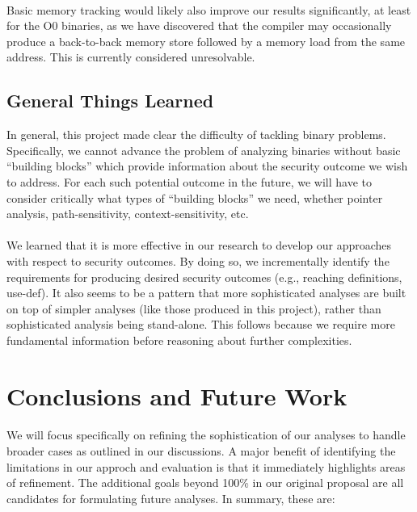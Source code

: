 \documentclass[letterpaper,11pt]{article}
\begin{document}
\paragraph{}
Basic memory tracking would likely also improve our results significantly, at
least for the O0 binaries, as we have discovered that the compiler may
occasionally produce a back-to-back memory store followed by a memory load from
the same address. This is currently considered unresolvable.

\subsection{General Things Learned}

In general, this project made clear the difficulty of tackling binary
problems. Specifically, we cannot advance the problem of analyzing binaries
without basic ``building blocks'' which provide information about the security
outcome we wish to address. For each such potential outcome in the future,
we will have to consider critically what types of ``building blocks'' we need,
whether pointer analysis, path-sensitivity, context-sensitivity, etc.

\paragraph{}
We learned that it is more effective in our research to develop our approaches
with respect to security outcomes. By doing so, we incrementally identify the
requirements for producing desired security outcomes (e.g., reaching
definitions, use-def). It also seems to be a pattern that more sophisticated
analyses are built on top of simpler analyses (like those produced in this
project), rather than sophisticated analysis being stand-alone. This follows
because we require more fundamental information before reasoning about
further complexities.

\section{Conclusions and Future Work}
\paragraph{}
We will focus specifically on refining the sophistication of our analyses
to handle broader cases as outlined in our discussions. A major benefit of
identifying the limitations in our approch and evaluation is that it
immediately highlights areas of refinement. The additional goals beyond 100\%
in our original proposal are all candidates for formulating future analyses.
In summary, these are:
\end{document}
